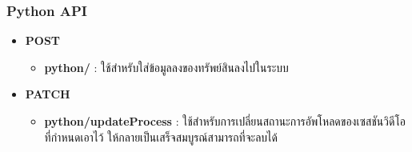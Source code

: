 \subsubsection{Python API}

\ifenglish
\else
\begin{itemize}
    \item \textbf{POST}
    \begin{itemize}
        \item \textbf{python/} : ใช้สำหรับใส่ข้อมูลลงของทรัพย์สินลงไปในระบบ
    \end{itemize}
    \item \textbf{PATCH}
    \begin{itemize}
        \item \textbf{python/updateProcess} : ใช้สำหรับการเปลี่ยนสถานะการอัพโหลดของเซสชันวิดีโอที่กำหนดเอาไว้ ให้กลายเป็นเสร็จสมบูรณ์สามารถที่จะลบได้
    \end{itemize}
\end{itemize}
\fi